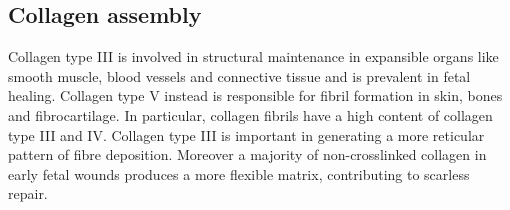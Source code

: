 	\subsection{Collagen assembly}
	Collagen type III is involved in structural maintenance in expansible organs like smooth muscle, blood vessels and connective tissue and is prevalent in fetal healing.
	Collagen type V instead is responsible for fibril formation in skin, bones and fibrocartilage.
	In particular, collagen fibrils have a high content of collagen type III and IV.
	Collagen type III is important in generating a more reticular pattern of fibre deposition.
	Moreover a majority of non-crosslinked collagen in early fetal wounds produces a more flexible matrix, contributing to scarless repair.

